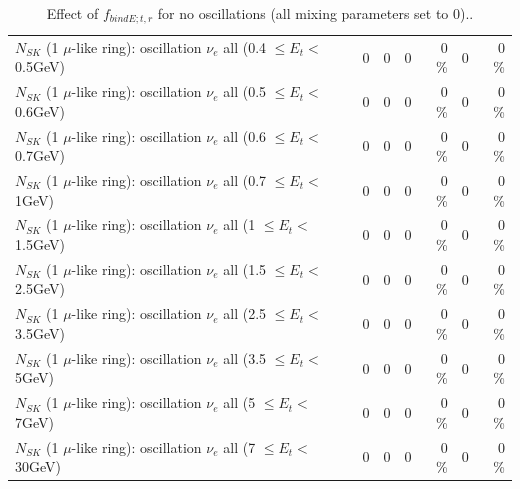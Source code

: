 \begin{table}
\begin{tabular}{| l | r | r | r  r | r  r |}
$N_{SK}$ (1 $\mu$-like ring): oscillation $\nu_{e}$ all (0.4 $\leq E_{t} <$ 0.5GeV) &               0 &               0 &               0 &        0 \%  &               0 &        0 \%  \\ 
$N_{SK}$ (1 $\mu$-like ring): oscillation $\nu_{e}$ all (0.5 $\leq E_{t} <$ 0.6GeV) &               0 &               0 &               0 &        0 \%  &               0 &        0 \%  \\ 
$N_{SK}$ (1 $\mu$-like ring): oscillation $\nu_{e}$ all (0.6 $\leq E_{t} <$ 0.7GeV) &               0 &               0 &               0 &        0 \%  &               0 &        0 \%  \\ 
$N_{SK}$ (1 $\mu$-like ring): oscillation $\nu_{e}$ all (0.7 $\leq E_{t} <$ 1GeV) &               0 &               0 &               0 &        0 \%  &               0 &        0 \%  \\ 
$N_{SK}$ (1 $\mu$-like ring): oscillation $\nu_{e}$ all (1 $\leq E_{t} <$ 1.5GeV) &               0 &               0 &               0 &        0 \%  &               0 &        0 \%  \\ 
$N_{SK}$ (1 $\mu$-like ring): oscillation $\nu_{e}$ all (1.5 $\leq E_{t} <$ 2.5GeV) &               0 &               0 &               0 &        0 \%  &               0 &        0 \%  \\ 
$N_{SK}$ (1 $\mu$-like ring): oscillation $\nu_{e}$ all (2.5 $\leq E_{t} <$ 3.5GeV) &               0 &               0 &               0 &        0 \%  &               0 &        0 \%  \\ 
$N_{SK}$ (1 $\mu$-like ring): oscillation $\nu_{e}$ all (3.5 $\leq E_{t} <$ 5GeV) &               0 &               0 &               0 &        0 \%  &               0 &        0 \%  \\ 
 $N_{SK}$ (1 $\mu$-like ring): oscillation $\nu_{e}$ all (5 $\leq E_{t} <$ 7GeV) &               0 &               0 &               0 &        0 \%  &               0 &        0 \%  \\ 
$N_{SK}$ (1 $\mu$-like ring): oscillation $\nu_{e}$ all (7 $\leq E_{t} <$ 30GeV) &               0 &               0 &               0 &        0 \%  &               0 &        0 \%  \\ 
\hline
\hline
\end{tabular}
\caption{ Effect of $f_{bindE; t, r}$ for no oscillations (all mixing parameters set to 0).. }
\label{tab:num_xsec_bindE_1RmuT_3f_osc_t13:0}
\end{table}
\clearpage
